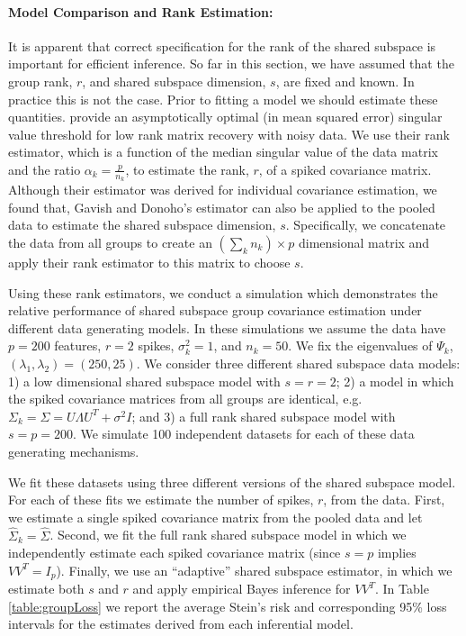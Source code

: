 \documentclass[12pt]{article}
\begin{document}
\paragraph{Model Comparison and Rank Estimation:}

It is apparent that correct specification for the rank of the shared
subspace is important for efficient inference.  So far in this
section, we have assumed that the group rank, $r$, and shared subspace
dimension, $s$, are fixed and known.  In practice this is not the
case.  Prior to fitting a model we should estimate these quantities.
\citet{Gavish2014} provide an asymptotically optimal (in mean squared
error) singular value threshold for low rank matrix recovery with
noisy data.  We use their rank estimator, which is a function of the
median singular value of the data matrix and the ratio
$\alpha_k =\frac{p}{n_k}$, to estimate the rank, $r$, of a spiked
covariance matrix.  Although their estimator was derived for
individual covariance estimation, we found that, Gavish and Donoho's
estimator can also be applied to the pooled data to estimate the
shared subspace dimension, $s$.  Specifically, we concatenate the data
from all groups to create an $(\sum_k n_k) \times p$ dimensional
matrix and apply their rank estimator to this matrix to choose $s$.

Using these rank estimators, we conduct a simulation which
demonstrates the relative performance of shared subspace group
covariance estimation under different data generating models.  In
these simulations we assume the data have $p=200$ features, $r=2$
spikes, $\sigma^2_k=1$, and $n_k = 50$.  We fix the eigenvalues of
$\Psi_k$, $(\lambda_1, \lambda_2) = (250, 25)$.  We consider three
different shared subspace data models: 1) a low dimensional shared
subspace model with $s=r=2$; 2) a model in which the spiked covariance
matrices from all groups are identical, e.g.
$\Sigma_k = \Sigma = U\Lambda U^T + \sigma^2I$; and 3) a full rank
shared subspace model with $s=p=200$.  We simulate 100 independent
datasets for each of these data generating mechanisms.

We fit these datasets using three different versions of the shared
subspace model.  For each of these fits we estimate the number of
spikes, $r$, from the data.  First, we estimate a single spiked
covariance matrix from the pooled data and let
$\hat{\Sigma}_k = \hat{\Sigma}$.  Second, we fit the full rank shared
subspace model in which we independently estimate each spiked
covariance matrix (since $s=p$ implies $VV^T = I_p$).  Finally, we use
an ``adaptive'' shared subspace estimator, in which we estimate both
$s$ and $r$ and apply empirical Bayes inference for $VV^T$.  In Table
\ref{table:groupLoss} we report the average Stein's risk and
corresponding 95\% loss intervals for the estimates derived from each
inferential model.
\end{document}

